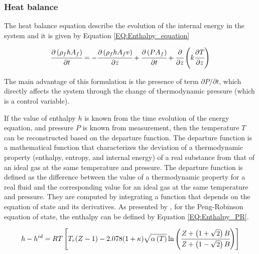 \documentclass[../Article_Model_Parameters.tex]{subfiles}
\begin{document}
			
							
			\subsubsection{Heat balance} \label{CH: heat_balance}
			
			The heat balance equation describe the evolution of the internal energy in the system and it is given by Equation \ref{EQ:Enthalpy_equation}
			
			{\footnotesize
				\begin{equation} \label{EQ:Enthalpy_equation}
					\cfrac{\partial \left(\rho_f {\color{black}h} A_f\right)}{\partial t} = - \cfrac{\partial \left( \rho_f {\color{black}h} A_f v \right)}{\partial z} + \cfrac{\partial \left(P A_f\right)}{\partial t} + \cfrac{\partial}{\partial z} \left( k \cfrac{\partial T}{\partial z} \right)
				\end{equation}
			}
			
			The main advantage of this formulation is the presence of term $\partial P / \partial t $, which directly affects the system through the change of thermodynamic pressure (which is a control variable). %
			
			If the value of enthalpy $h$ is known from the time evolution of the energy equation, and pressure $P$ is known from measurement, then the temperature $T$ can be reconstructed based on the departure function. The departure function is a mathematical function that characterizes the deviation of a thermodynamic property (enthalpy, entropy, and internal energy) of a real substance from that of an ideal gas at the same temperature and pressure. The departure function is defined as the difference between the value of a thermodynamic property for a real fluid and the corresponding value for an ideal gas at the same temperature and pressure. They are computed by integrating a function that depends on the equation of state and its derivatives. As presented by \citet{Gmehling2019}, for the Peng-Robinson equation of state, the enthalpy can be defined by Equation \ref{EQ:Enthalpy_PR}.
			
			{\scriptsize
				\begin{equation}
					{\color{black}h}-{\color{black}h}^{id}={\color{black}R}T \left[{\color{black}T_r}({\color{black}Z}-1) -2.078(1+{\color{black}\kappa} ){\sqrt { {\color{black}\alpha}\left(T\right) } } \ln \left(\cfrac{{\color{black}Z}+\left( 1+\sqrt{2} \right){\color{black}B}}{{\color{black}Z}+\left( 1-\sqrt{2} \right){\color{black}B}}\right)\right]
					\label{EQ:Enthalpy_PR}
				\end{equation}				
			}
			
\end{document}
